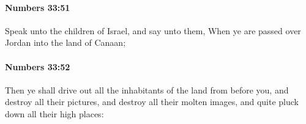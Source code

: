 		\paragraph{Numbers 33:51} %
			\label{NUMBERS-33-51}

			Speak unto the children of Israel, and say unto them, When ye are passed over Jordan into the land of Canaan;


		\paragraph{Numbers 33:52} %
			\label{NUMBERS-33-52}

			Then ye shall drive out all the inhabitants of the land from before you, and destroy all their pictures, and destroy all their molten images, and quite pluck down all their high places:


